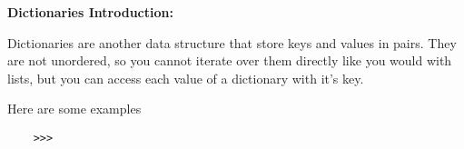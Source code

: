 \textbf{Dictionaries Introduction:}

Dictionaries are another data structure that store keys and values in pairs. 
They are not unordered, so you cannot iterate over them directly like you would with lists,
but you can access each value of a dictionary with it's key.

Here are some examples

\begin{lstlisting}
    >>> 
\end{lstlisting}